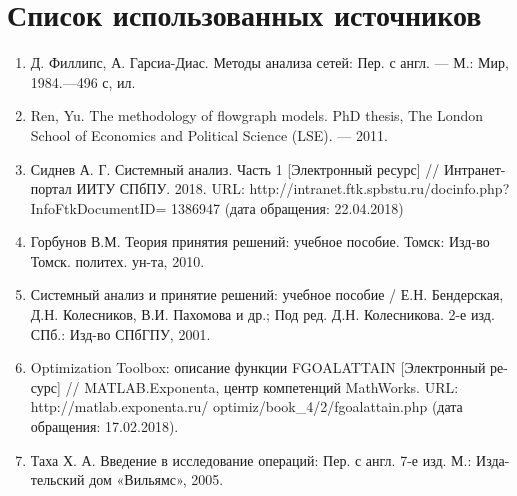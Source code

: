 \chapter*{Список использованных источников}
\begin{enumerate}
\item Д. Филлипс, А. Гарсиа-Диас. Методы анализа сетей: Пер. с англ. — М.: Мир, 1984.—496 с, ил.
\item Ren, Yu. The methodology of flowgraph models. PhD thesis, The London School of Economics and Political Science (LSE). –– 2011.
\item Сиднев А. Г. Системный анализ. Часть 1 [Электронный ресурс] // Интранет-
портал ИИТУ СПбПУ. 2018. URL: http://intranet.ftk.spbstu.ru/docinfo.php?InfoFtkDocumentID= 1386947 (дата обращения: 22.04.2018)
\item Горбунов В.М. Теория принятия решений: учебное пособие. Томск: Изд-во
Томск. политех. ун-та, 2010.
\item Системный анализ и принятие решений: учебное пособие / Е.Н. Бендерская,
Д.Н. Колесников, В.И. Пахомова и др.; Под ред. Д.Н. Колесникова. 2-е изд.
СПб.: Изд-во СПбГПУ, 2001.
\item Optimization Toolbox: описание функции FGOALATTAIN [Электронный ре-
сурс] // MATLAB.Exponenta, центр компетенций MathWorks. URL:
http://matlab.exponenta.ru/ optimiz/book\_4/2/fgoalattain.php (дата обращения:
17.02.2018).
\item Таха Х. А. Введение в исследование операций: Пер. с англ. 7-е изд. М.: Изда-тельский дом «Вильямс», 2005.
\end{enumerate}


%
%


\clearpage
{}
\setcounter{section}{0}
